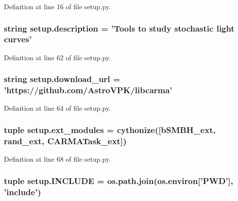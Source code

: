 Definition at line 16 of file setup.\-py.

\hypertarget{namespacesetup_ade8aa54df2083113a10326ea2fe7934b}{
\subsubsection[{description}]{\setlength{\rightskip}{0pt plus 5cm}string setup.\-description = 'Tools to study stochastic light curves'}}\label{namespacesetup_ade8aa54df2083113a10326ea2fe7934b}


Definition at line 62 of file setup.\-py.

\hypertarget{namespacesetup_ace7471dbb37081610d405f437793b251}{
\subsubsection[{download\-\_\-url}]{\setlength{\rightskip}{0pt plus 5cm}string setup.\-download\-\_\-url = 'https\-://github.\-com/Astro\-V\-P\-K/libcarma'}}\label{namespacesetup_ace7471dbb37081610d405f437793b251}


Definition at line 64 of file setup.\-py.

\hypertarget{namespacesetup_af330bcdd4c9a596a47b19a6b99efbd53}{
\subsubsection[{ext\-\_\-modules}]{\setlength{\rightskip}{0pt plus 5cm}tuple setup.\-ext\-\_\-modules = cythonize(\mbox{[}{\bf b\-S\-M\-B\-H\-\_\-ext}, {\bf rand\-\_\-ext}, {\bf C\-A\-R\-M\-A\-Task\-\_\-ext}\mbox{]})}}\label{namespacesetup_af330bcdd4c9a596a47b19a6b99efbd53}


Definition at line 68 of file setup.\-py.

\hypertarget{namespacesetup_acf0d303c559d8ca52f78fb7970b2de4d}{
\subsubsection[{I\-N\-C\-L\-U\-D\-E}]{\setlength{\rightskip}{0pt plus 5cm}tuple setup.\-I\-N\-C\-L\-U\-D\-E = os.\-path.\-join(os.\-environ\mbox{[}'P\-W\-D'\mbox{]}, 'include')}}\label{namespacesetup_acf0d303c559d8ca52f78fb7970b2de4d}


